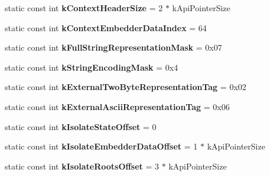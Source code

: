 \begin{DoxyCompactItemize}
\item 
\hypertarget{classv8_1_1internal_1_1_internals_aa5187d7653158ef851c53594e6e63851}{}static const int {\bfseries k\+Context\+Header\+Size} = 2 $\ast$ k\+Api\+Pointer\+Size\label{classv8_1_1internal_1_1_internals_aa5187d7653158ef851c53594e6e63851}

\item 
\hypertarget{classv8_1_1internal_1_1_internals_afb65846499ec5f68172e4b2e8301a493}{}static const int {\bfseries k\+Context\+Embedder\+Data\+Index} = 64\label{classv8_1_1internal_1_1_internals_afb65846499ec5f68172e4b2e8301a493}

\item 
\hypertarget{classv8_1_1internal_1_1_internals_a5c39a86b30463928ea719def66916507}{}static const int {\bfseries k\+Full\+String\+Representation\+Mask} = 0x07\label{classv8_1_1internal_1_1_internals_a5c39a86b30463928ea719def66916507}

\item 
\hypertarget{classv8_1_1internal_1_1_internals_a1927ac3def13a57e03025e62ca46d1c5}{}static const int {\bfseries k\+String\+Encoding\+Mask} = 0x4\label{classv8_1_1internal_1_1_internals_a1927ac3def13a57e03025e62ca46d1c5}

\item 
\hypertarget{classv8_1_1internal_1_1_internals_a73faf917416d2519b65c7255e77a74ce}{}static const int {\bfseries k\+External\+Two\+Byte\+Representation\+Tag} = 0x02\label{classv8_1_1internal_1_1_internals_a73faf917416d2519b65c7255e77a74ce}

\item 
\hypertarget{classv8_1_1internal_1_1_internals_adea2f5a76d07821f7fa885a8dcda0eec}{}static const int {\bfseries k\+External\+Ascii\+Representation\+Tag} = 0x06\label{classv8_1_1internal_1_1_internals_adea2f5a76d07821f7fa885a8dcda0eec}

\item 
\hypertarget{classv8_1_1internal_1_1_internals_af591f991ecb24f9f6b33209e33b0d9ef}{}static const int {\bfseries k\+Isolate\+State\+Offset} = 0\label{classv8_1_1internal_1_1_internals_af591f991ecb24f9f6b33209e33b0d9ef}

\item 
\hypertarget{classv8_1_1internal_1_1_internals_ad722bf4760df09958cd1062db4a5524c}{}static const int {\bfseries k\+Isolate\+Embedder\+Data\+Offset} = 1 $\ast$ k\+Api\+Pointer\+Size\label{classv8_1_1internal_1_1_internals_ad722bf4760df09958cd1062db4a5524c}

\item 
\hypertarget{classv8_1_1internal_1_1_internals_a3142f942a25203ce7fca0e9a4563c74d}{}static const int {\bfseries k\+Isolate\+Roots\+Offset} = 3 $\ast$ k\+Api\+Pointer\+Size\label{classv8_1_1internal_1_1_internals_a3142f942a25203ce7fca0e9a4563c74d}


\end{DoxyCompactItemize}
